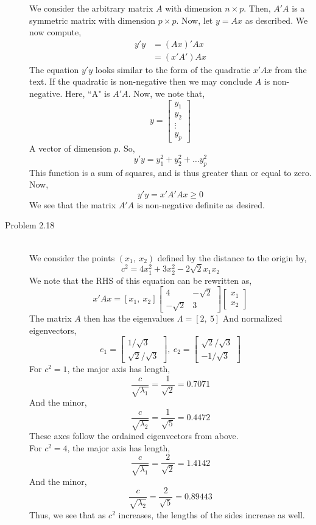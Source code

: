 \documentclass[letterpaper,10pt]{article}
\begin{document}
\begin{description}
We consider the arbitrary matrix $A$ with dimension $n\times p$. Then, $A'A$ is a symmetric matrix with dimension $p\times p$. Now, let $y=Ax$ as described. We now compute,
\begin{align*}
y'y &= (Ax)'Ax\\
&= (x'A')Ax
\end{align*}
The equation $y'y$ looks similar to the form of the quadratic $x'Ax$ from the text. If the quadratic is non-negative then we may conclude $A$ is non-negative. Here, ``A" is $A'A$. Now, we note that,
\[y=\begin{bmatrix}
y_1\\y_2\\\vdots\\y_p
\end{bmatrix}\]
A vector of dimension $p$. So,
\[y'y=y_1^2+y_2^2+\ldots y_p^2\]
This function is a sum of squares, and is thus greater than or equal to zero. Now,
\[y'y=x'A'Ax\geq 0 \]
We see that the matrix $A'A$ is non-negative definite as desired.
\item[Problem 2.18]\hfill\\
We consider the points $(x_1,\ x_2)$ defined by the distance to the origin by,
\[c^2=4x_1^2+3x_2^2-2\sqrt{2}x_1x_2\]
We note that the RHS of this equation can be rewritten as,
\[x'Ax=[x_1,\ x_2]\begin{bmatrix}
4 & -\sqrt{2}\\-\sqrt{2} & 3
\end{bmatrix}\begin{bmatrix}
x_1\\x_2
\end{bmatrix} \]
The matrix $A$ then has the eigenvalues $\Lambda=[2,\ 5]$
And normalized eigenvectors,
\[e_1=\begin{bmatrix}
1/\sqrt{3}\\\sqrt{2}/\sqrt{3}
\end{bmatrix},\ e_2=\begin{bmatrix}
\sqrt{2}/\sqrt{3} \\ -1/\sqrt{3}
\end{bmatrix} \]
For $c^2=1$, the major axis has length,
\[\frac{c}{\sqrt{\lambda_1}}=\frac{1}{\sqrt{2}}=0.7071\]
And the minor,
\[\frac{c}{\sqrt{\lambda_2}}=\frac{1}{\sqrt{5}}=0.4472\]
These axes follow the ordained eigenvectors from above.\\
For $c^2=4$, the major axis has length,
\[\frac{c}{\sqrt{\lambda_1}}=\frac{2}{\sqrt{2}}=1.4142\]
And the minor,
\[\frac{c}{\sqrt{\lambda_2}}=\frac{2}{\sqrt{5}}=0.89443\]
Thus, we see that as $c^2$ increases, the lengths of the sides increase as well.

\end{description}
\end{document}
